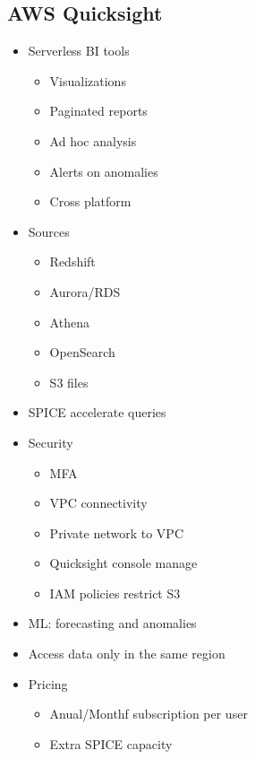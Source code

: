 \documentclass[../../main.tex]{subfiles}
\begin{document}
\subsection{AWS Quicksight}
\begin{itemize}
    \item Serverless BI tools
    \begin{itemize}
        \item Visualizations
        \item Paginated reports
        \item Ad hoc analysis
        \item Alerts on anomalies
        \item Cross platform
    \end{itemize}
    \item Sources
    \begin{itemize}
        \item Redshift
        \item Aurora/RDS
        \item Athena
        \item OpenSearch
        \item S3 files
    \end{itemize}
    \item SPICE accelerate queries
    \item Security
    \begin{itemize}
        \item MFA
        \item VPC connectivity
        \item Private network to VPC
        \item Quicksight console manage
        \item IAM policies restrict S3
    \end{itemize}
    \item ML: forecasting and anomalies
    \item Access data only in the same region
    \item Pricing
    \begin{itemize}
        \item Anual/Monthf subscription per user
        \item Extra SPICE capacity
    \end{itemize}
\end{itemize}
\end{document}
